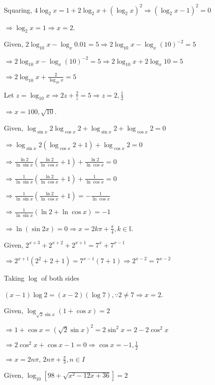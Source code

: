   Squaring, $4\log_2x = 1 + 2\log_2x + (\log_2x)^2 \Rightarrow (\log_2x - 1)^2 = 0$

  $\Rightarrow \log_2x = 1 \Rightarrow x = 2$.
\item Given, $2\log_{10}x - \log_x0.01 = 5 \Rightarrow 2\log_{10}x - \log_x(10)^{-2} = 5$

  $\Rightarrow 2\log_{10}x - \log_x(10)^{-2} = 5 \Rightarrow 2\log_{10}x + 2\log_x10 = 5$

  $\Rightarrow 2\log_{10}x + \frac{2}{\log_{10}x} = 5$

  Let $z = \log_{10}x \Rightarrow 2z + \frac{2}{z} = 5 \Rightarrow z = 2, \frac{1}{2}$

  $\Rightarrow x = 100, \sqrt{10}$.
\item Given, $\log_{\sin x}2\log_{\cos x}2 + \log_{\sin x}2 + \log_{\cos x}2 = 0$

  $\Rightarrow \log_{\sin x}2(\log_{\cos x}2 + 1) + \log_{\cos x}2 = 0$

  $\Rightarrow \frac{\ln 2}{\ln \sin x}\left(\frac{\ln 2}{\ln \cos x} + 1\right) + \frac{\ln 2}{\ln \cos x} = 0$

  $\Rightarrow \frac{1}{\ln \sin x}\left(\frac{\ln 2}{\ln \cos x} + 1\right) + \frac{1}{\ln \cos x} = 0$

  $\Rightarrow \frac{1}{\ln \sin x}\left(\frac{\ln 2}{\ln \cos x} + 1\right) = -\frac{1}{\ln \cos x}$

  $\Rightarrow \frac{1}{\ln \sin x}(\ln 2 + \ln\cos x) = -1$

  $\Rightarrow \ln(\sin2x) = 0\Rightarrow x = 2k\pi + \frac{\pi}{4}, k\in\mathbb{I}$.
\item Given, $2^{x + 3} + 2^{x+2} + 2^{x + 1} = 7^x + 7^{x - 1}$

  $\Rightarrow 2^{x + 1}(2^2 + 2 + 1) = 7^{x - 1}(7 + 1) \Rightarrow 2^{x - 2} = 7^{x - 2}$

  Taking $\log$ of both sides

  $(x - 1)\log 2 = (x - 2)(\log 7), \because 2\neq 7 \Rightarrow x = 2$.
\item Given, $\log_{\sqrt{2}\sin x}(1 + \cos x) = 2$

  $\Rightarrow 1 + \cos x = (\sqrt{2}\sin x)^2 = 2\sin^2x = 2 - 2\cos^2 x$

  $\Rightarrow 2\cos^2x + \cos x - 1 = 0 \Rightarrow \cos x = -1, \frac{1}{2}$

  $\Rightarrow x = 2n\pi,\,2n\pi + \frac{\pi}{3}, n\in I$
\item Given, $\log_{10}[98 + \sqrt{x^2 - 12x + 36}] = 2$

